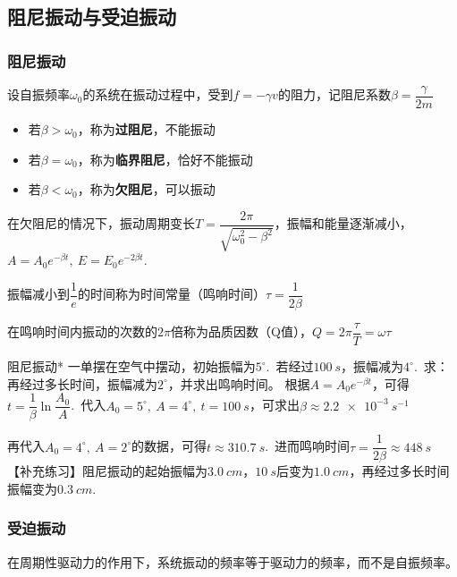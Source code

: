 \subsection{阻尼振动与受迫振动}

\subsubsection{阻尼振动}

设自振频率$\omega_0$的系统在振动过程中，受到$f=-\gamma v$的阻力，记阻尼系数$\beta=\dfrac{\gamma}{2m}$

\begin{itemize}
    \item 若$\beta>\omega_0$，称为\textbf{过阻尼}，不能振动
    \item 若$\beta=\omega_0$，称为\textbf{临界阻尼}，恰好不能振动
    \item 若$\beta<\omega_0$，称为\textbf{欠阻尼}，可以振动
\end{itemize}

在欠阻尼的情况下，振动周期变长$T=\dfrac{2\pi}{\sqrt{\omega_0^2-\beta^2}}$，振幅和能量逐渐减小，$A=A_0 e^{-\beta t},~E=E_0 e^{-2\beta t}$.

振幅减小到$\dfrac{1}{e}$的时间称为时间常量（鸣响时间）$\tau=\dfrac{1}{2\beta}$

在鸣响时间内振动的次数的$2\pi$倍称为品质因数（Q值），$Q=2\pi\dfrac{\tau}{T}=\omega \tau$

\begin{example}{阻尼振动*}
    一单摆在空气中摆动，初始振幅为$5^\circ$.~若经过$\SI{100}{s}$，振幅减为$4^\circ$.~求：再经过多长时间，振幅减为$2^\circ$，并求出鸣响时间。
    \tcblower
    根据$A=A_0 e^{-\beta t}$，可得$t=\dfrac{1}{\beta}\ln{\dfrac{A_0}{A}}$.~代入$A_0=5^\circ,~A=4^\circ,~t=\SI{100}{s}$，可求出$\beta\approx \SI{2.2e-3}{s^{-1}}$
    
    再代入$A_0=4^\circ,~A=2^\circ$的数据，可得$t\approx \SI{310.7}{s}$.~进而鸣响时间$\tau=\dfrac{1}{2\beta}\approx \SI{448}{s}$
    \tcbline
    【补充练习】阻尼振动的起始振幅为$\SI{3.0}{cm}$，$\SI{10}{s}$后变为$\SI{1.0}{cm}$，再经过多长时间振幅变为$\SI{0.3}{cm}$.
\end{example}

\subsubsection{受迫振动}

在周期性驱动力的作用下，系统振动的频率等于驱动力的频率，而不是自振频率。

